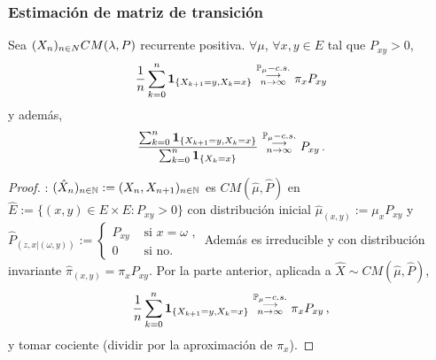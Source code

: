 \subsubsection{Estimación de matriz de transición}
\begin{corolary}
Sea $\xcm \cm$ recurrente positiva. $\forall \mu$, $\forall x,y\in E$ tal que $P_{xy}>0$,
$$ \displaystyle\frac{1}{n}\sum^n_{k=0}\mathbf{1}_{\{X_{k+1}=y,X_k=x\}} \mbox{ }\overset{\P_\mu-c.s.}{\substack{\longrightarrow \\n \to \infty}}\mbox{ }\pi_xP_{xy}$$
y además,
$$ \displaystyle \frac{\sum^n_{k=0}\mathbf{1}_{\{X_{k+1}=y,X_k=x\}}}{\sum^n_{k=0}\mathbf{1}_{\{X_{k}=x\}}}\mbox{ }\overset{\P_\mu-c.s.}{\substack{\longrightarrow \\n \to \infty}}\mbox{ }P_{xy}\,.$$
\end{corolary}
\begin{proof}
\ejercicio \gris: \newline $(\hat{X}_n)_{n\in\N}:=(X_n,X_{n+1})_{n\in\N}$ es $CM(\hat{\mu},\hat{P})$ en $\hat{E}:=\{(x,y)\in E\times E:P_{xy}>0\}$ con distribución inicial $\hat{\mu}_{(x,y)}:=\mu_xP_{xy}$ y $\hat{P}_{(z,x|(\omega,y))}:=\begin{cases}
P_{xy}
& \mbox{ si }x=\omega \mbox{ ,}\\
0 & \mbox{ si no.}
\end{cases}$ \newline Además es irreducible y con distribución invariante $\hat{\pi}_{(x,y)}=\pi_xP_{xy}$.
\newline Por la parte anterior, aplicada a $\hat{X}\sim CM(\hat{\mu},\hat{P})$,
$$ \displaystyle\frac{1}{n}\sum^n_{k=0}\mathbf{1}_{\{X_{k+1}=y,X_k=x\}} \mbox{ }\overset{\P_\mu-c.s.}{\substack{\longrightarrow \\n \to \infty}}\mbox{ }\pi_xP_{xy} \, ,$$ y tomar cociente (dividir por la aproximación de $\pi_x$). \negro \findem
\end{proof}

